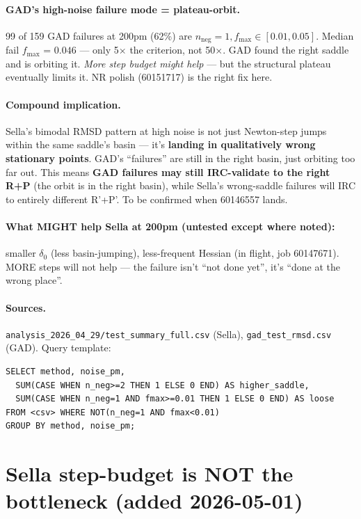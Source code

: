 \documentclass[11pt]{article}
\begin{document}
\paragraph{GAD's high-noise failure mode = plateau-orbit.} 99 of 159
GAD failures at 200pm (62\%) are $n_{\text{neg}}=1, f_{\max}\in[0.01, 0.05]$.
Median fail $f_{\max}$ = $0.046$ — only 5$\times$ the criterion, not 50$\times$.
GAD found the right saddle and is orbiting it. \emph{More step budget
might help} — but the structural plateau eventually limits it. NR polish
(60151717) is the right fix here.

\paragraph{Compound implication.} Sella's bimodal RMSD pattern at high
noise is not just Newton-step jumps within the same saddle's basin —
it's \textbf{landing in qualitatively wrong stationary points}. GAD's
``failures'' are still in the right basin, just orbiting too far out.
This means \textbf{GAD failures may still IRC-validate to the right
R+P} (the orbit is in the right basin), while Sella's wrong-saddle
failures will IRC to entirely different R'+P'. To be confirmed when
60146557 lands.

\paragraph{What MIGHT help Sella at 200pm (untested except where noted):}
smaller $\delta_0$ (less basin-jumping), less-frequent Hessian (in flight,
job 60147671). MORE steps will not help — the failure isn't ``not done
yet'', it's ``done at the wrong place''.

\paragraph{Sources.}
\texttt{analysis\_2026\_04\_29/test\_summary\_full.csv} (Sella),
\texttt{gad\_test\_rmsd.csv} (GAD).
Query template:
\begin{verbatim}
SELECT method, noise_pm,
  SUM(CASE WHEN n_neg>=2 THEN 1 ELSE 0 END) AS higher_saddle,
  SUM(CASE WHEN n_neg=1 AND fmax>=0.01 THEN 1 ELSE 0 END) AS loose
FROM <csv> WHERE NOT(n_neg=1 AND fmax<0.01)
GROUP BY method, noise_pm;
\end{verbatim}

\section{Sella step-budget is NOT the bottleneck (added 2026-05-01)}
\end{document}

